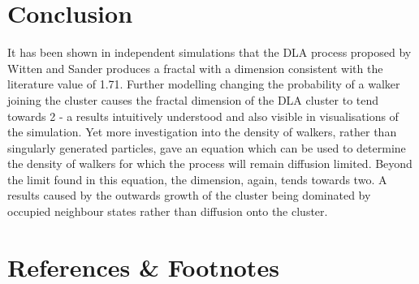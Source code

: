 \documentclass[%
 aapm,
 mph,%
 amsmath,amssymb,
 reprint,%
]{revtex4-2}
\begin{document}
\section{\label{sec:conclusion}Conclusion}
It has been shown in independent simulations that the DLA process proposed by Witten and Sander\cite{WittenDLA} produces a fractal with a dimension consistent with the literature value of 1.71\cite{FractalsBook}. Further modelling changing the probability of a walker joining the cluster causes the fractal dimension of the DLA cluster to tend towards 2 - a results intuitively understood and also visible in visualisations of the simulation. Yet more investigation into the density of walkers, rather than singularly generated particles, gave an equation which can be used to determine the density of walkers for which the process will remain diffusion limited. Beyond the limit found in this equation, the dimension, again, tends towards two. A results caused by the outwards growth of the cluster being dominated by occupied neighbour states rather than diffusion onto the cluster.
\newpage

\appendix
\newpage
\section{References \& Footnotes}
\newpage
\end{document}
